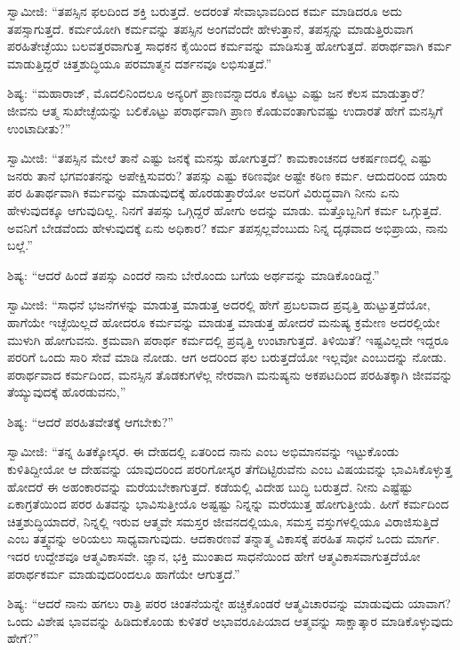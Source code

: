 \vskip 2pt

 ಸ್ವಾಮೀಜಿ: “ತಪಸ್ಸಿನ ಫಲದಿಂದ ಶಕ್ತಿ ಬರುತ್ತದೆ. ಅದರಂತೆ ಸೇವಾಭಾವದಿಂದ ಕರ್ಮ ಮಾಡಿದರೂ ಅದು ತಪಸ್ಸಾಗುತ್ತದೆ. ಕರ್ಮಯೋಗಿ ಕರ್ಮವನ್ನು ತಪಸ್ಸಿನ ಅಂಗವೆಂದೇ ಹೇಳುತ್ತಾನೆ, ತಪಸ್ಸನ್ನು ಮಾಡುತ್ತಿರುವಾಗ ಪರಹಿತೇಚ್ಛೆಯು ಬಲವತ್ತರವಾಗುತ್ತ ಸಾಧಕನ ಕೈಯಿಂದ ಕರ್ಮವನ್ನು ಮಾಡಿಸುತ್ತ ಹೋಗುತ್ತದೆ. ಪರಾರ್ಥವಾಗಿ ಕರ್ಮ ಮಾಡುತ್ತಿದ್ದರೆ ಚಿತ್ತಶುದ್ಧಿಯೂ ಪರಮಾತ್ಮನ ದರ್ಶನವೂ ಲಭಿಸುತ್ತದೆ.” 

 ಶಿಷ್ಯ: “ಮಹಾರಾಜ್, ಮೊದಲಿನಿಂದಲೂ ಅನ್ಯರಿಗೆ ಪ್ರಾಣವನ್ನಾದರೂ ಕೊಟ್ಟು ಎಷ್ಟು ಜನ ಕೆಲಸ ಮಾಡುತ್ತಾರೆ? ಜೀವನು ಆತ್ಮ ಸುಖೇಚ್ಛೆಯನ್ನು ಬಲಿಕೊಟ್ಟು ಪರಾರ್ಥವಾಗಿ ಪ್ರಾಣ ಕೊಡುವಂತಾಗುವಷ್ಟು ಉದಾರತೆ ಹೇಗೆ ಮನಸ್ಸಿಗೆ ಉಂಟಾದೀತು?” 

 ಸ್ವಾಮೀಜಿ: “ತಪಸ್ಸಿನ ಮೇಲೆ ತಾನೆ ಎಷ್ಟು ಜನಕ್ಕೆ ಮನಸ್ಸು ಹೋಗುತ್ತದೆ? ಕಾಮಕಾಂಚನದ ಆಕರ್ಷಣದಲ್ಲಿ ಎಷ್ಟು ಜನರು ತಾನೆ ಭಗವಂತನನ್ನು ಅಪೇಕ್ಷಿಸುವರು? ತಪಸ್ಸು ಎಷ್ಟು ಕಠಿಣವೋ ಅಷ್ಟೇ ಕಠಿಣ ಕರ್ಮ. ಆದುದರಿಂದ ಯಾರು ಪರ ಹಿತಾರ್ಥವಾಗಿ ಕರ್ಮವನ್ನು ಮಾಡುವುದಕ್ಕೆ ಹೊರಡುತ್ತಾರೆಯೋ ಅವರಿಗೆ ವಿರುದ್ಧವಾಗಿ ನೀನು ಏನು ಹೇಳುವುದಕ್ಕೂ ಆಗುವುದಿಲ್ಲ. ನಿನಗೆ ತಪಸ್ಸು ಒಗ್ಗಿದ್ದರೆ ಹೋಗು ಅದನ್ನು ಮಾಡು. ಮತ್ತೊಬ್ಬನಿಗೆ ಕರ್ಮ ಒಗ್ಗುತ್ತದೆ. ಅವನಿಗೆ ಬೇಡವೆಂದು ಹೇಳುವುದಕ್ಕೆ ಏನು ಅಧಿಕಾರ? ಕರ್ಮ ತಪಸ್ಸಲ್ಲವೆಂಬುದು ನಿನ್ನ ದೃಢವಾದ ಅಭಿಪ್ರಾಯ, ನಾನು ಬಲ್ಲೆ.” 

 ಶಿಷ್ಯ: “ಆದರೆ ಹಿಂದೆ ತಪಸ್ಸು ಎಂದರೆ ನಾನು ಬೇರೊಂದು ಬಗೆಯ ಅರ್ಥವನ್ನು ಮಾಡಿಕೊಂಡಿದ್ದೆ.” 

 ಸ್ವಾಮೀಜಿ: “ಸಾಧನೆ ಭಜನೆಗಳನ್ನು ಮಾಡುತ್ತ ಮಾಡುತ್ತ ಅದರಲ್ಲಿ ಹೇಗೆ ಪ್ರಬಲವಾದ ಪ್ರವೃತ್ತಿ ಹುಟ್ಟುತ್ತದೆಯೋ, ಹಾಗೆಯೇ ಇಚ್ಛೆಯಿಲ್ಲದೆ ಹೋದರೂ ಕರ್ಮವನ್ನು ಮಾಡುತ್ತ ಮಾಡುತ್ತ ಹೋದರೆ ಮನುಷ್ಯ ಕ್ರಮೇಣ ಅದರಲ್ಲಿಯೇ ಮುಳುಗಿ ಹೋಗುವನು. ಕ್ರಮವಾಗಿ ಪರಾರ್ಥ ಕರ್ಮದಲ್ಲಿ ಪ್ರವೃತ್ತಿ ಉಂಟಾಗುತ್ತದೆ. ತಿಳಿಯಿತೆ? ಇಷ್ಟವಿಲ್ಲದೇ ಇದ್ದರೂ ಪರರಿಗೆ ಒಂದು ಸಾರಿ ಸೇವೆ ಮಾಡಿ ನೋಡು. ಆಗ ಅದರಿಂದ ಫಲ ಬರುತ್ತದೆಯೋ ಇಲ್ಲವೋ ಎಂಬುದನ್ನು ನೋಡು. ಪರಾರ್ಥವಾದ ಕರ್ಮದಿಂದ, ಮನಸ್ಸಿನ ತೊಡಕುಗಳೆಲ್ಲ ನೇರವಾಗಿ ಮನುಷ್ಯನು ಅಕಪಟದಿಂದ ಪರಹಿತಕ್ಕಾಗಿ ಜೀವವನ್ನು ತೆಯ್ಯುವುದಕ್ಕೆ ಹೊರಡುವನು,” 

 ಶಿಷ್ಯ: “ಆದರೆ ಪರಹಿತವೇತಕ್ಕೆ ಆಗಬೇಕು?” 

 ಸ್ವಾಮೀಜಿ: “ತನ್ನ ಹಿತಕ್ಕೋಸ್ಕರ. ಈ ದೇಹದಲ್ಲಿ ಏತರಿಂದ ನಾನು ಎಂಬ ಅಭಿಮಾನವನ್ನು ಇಟ್ಟುಕೊಂಡು ಕುಳಿತಿದ್ದೀಯೋ ಆ ದೇಹವನ್ನು ಯಾವುದರಿಂದ ಪರರಿಗೋಸ್ಕರ ತೆಗೆದಿಟ್ಟಿರುವೆನು ಎಂಬ ವಿಷಯವನ್ನು ಭಾವಿಸಿಕೊಳ್ಳುತ್ತ ಹೋದರೆ ಈ ಅಹಂಕಾರವನ್ನು ಮರೆಯಬೇಕಾಗುತ್ತದೆ. ಕಡೆಯಲ್ಲಿ ವಿದೇಹ ಬುದ್ಧಿ ಬರುತ್ತದೆ. ನೀನು ಎಷ್ಟೆಷ್ಟು ಏಕಾಗ್ರತೆಯಿಂದ ಪರರ ಹಿತವನ್ನು ಭಾವಿಸುತ್ತೀಯೊ ಅಷ್ಟಷ್ಟು ನಿನ್ನನ್ನು ಮರೆಯುತ್ತ ಹೋಗುತ್ತೀಯೆ. ಹೀಗೆ ಕರ್ಮದಿಂದ ಚಿತ್ತಶುದ್ಧಿಯಾದರೆ, ನಿನ್ನಲ್ಲಿ ಇರುವ ಆತ್ಮವೇ ಸಮಸ್ತರ ಜೀವನದಲ್ಲಿಯೂ, ಸಮಸ್ತ ವಸ್ತುಗಳಲ್ಲಿಯೂ ವಿರಾಜಿಸುತ್ತಿದೆ ಎಂಬ ತತ್ತ್ವವನ್ನು ಅರಿಯಲು ಸಾಧ್ಯವಾಗುವುದು. ಆದಕಾರಣವೆ ತನ್ನಾತ್ಮ ವಿಕಾಸಕ್ಕೆ ಪರಹಿತ ಸಾಧನೆ ಒಂದು ಮಾರ್ಗ. ಇದರ ಉದ್ದೇಶವೂ ಆತ್ಮವಿಕಾಸವೇ. ಜ್ಞಾನ, ಭಕ್ತಿ ಮುಂತಾದ ಸಾಧನೆಯಿಂದ ಹೇಗೆ ಆತ್ಮವಿಕಾಸವಾಗುತ್ತದೆಯೋ ಪರಾರ್ಥಕರ್ಮ ಮಾಡುವುದರಿಂದಲೂ ಹಾಗೆಯೇ ಆಗುತ್ತದೆ.” 

 ಶಿಷ್ಯ: “ಆದರೆ ನಾನು ಹಗಲು ರಾತ್ರಿ ಪರರ ಚಿಂತನೆಯನ್ನೇ ಹಚ್ಚಿಕೊಂಡರೆ ಆತ್ಮವಿಚಾರವನ್ನು ಮಾಡುವುದು ಯಾವಾಗ? ಒಂದು ವಿಶೇಷ ಭಾವವನ್ನು ಹಿಡಿದುಕೊಂಡು ಕುಳಿತರೆ ಅಭಾವರೂಪಿಯಾದ ಆತ್ಮವನ್ನು ಸಾಕ್ಷಾತ್ಕಾರ ಮಾಡಿಕೊಳ್ಳುವುದು ಹೇಗೆ?” 


